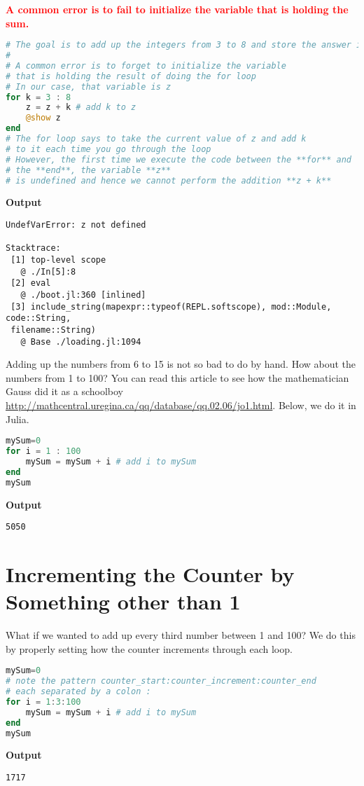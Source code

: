 \textcolor{red}{\bf A common error is to fail to initialize the variable that is holding the sum.}
\begin{lstlisting}[language=Julia,style=mystyle]
# The goal is to add up the integers from 3 to 8 and store the answer in z
#
# A common error is to forget to initialize the variable 
# that is holding the result of doing the for loop
# In our case, that variable is z
for k = 3 : 8
    z = z + k # add k to z
    @show z
end
# The for loop says to take the current value of z and add k 
# to it each time you go through the loop
# However, the first time we execute the code between the **for** and 
# the **end**, the variable **z** 
# is undefined and hence we cannot perform the addition **z + k**
\end{lstlisting}
\textbf{Output} 
\begin{verbatim}
UndefVarError: z not defined

Stacktrace:
 [1] top-level scope
   @ ./In[5]:8
 [2] eval
   @ ./boot.jl:360 [inlined]
 [3] include_string(mapexpr::typeof(REPL.softscope), mod::Module, code::String,
 filename::String)
   @ Base ./loading.jl:1094
\end{verbatim}

Adding up the numbers from 6 to 15 is not so bad to do by hand. How about the numbers from 1 to 100? You can read this article to see how the mathematician Gauss did it as a schoolboy \url{http://mathcentral.uregina.ca/qq/database/qq.02.06/jo1.html}. Below, we do it in Julia.

\begin{lstlisting}[language=Julia,style=mystyle]
mySum=0
for i = 1 : 100
    mySum = mySum + i # add i to mySum
end
mySum
\end{lstlisting}
\textbf{Output} 
\begin{verbatim}
5050
\end{verbatim}

\section{Incrementing the Counter by Something other than 1}
 
What if we wanted to add up every third number between 1 and 100? We do this by properly setting how the counter increments through each loop.

\begin{lstlisting}[language=Julia,style=mystyle]
mySum=0
# note the pattern counter_start:counter_increment:counter_end
# each separated by a colon :
for i = 1:3:100 
    mySum = mySum + i # add i to mySum
end
mySum
\end{lstlisting}
\textbf{Output} 
\begin{verbatim}
1717
\end{verbatim}

